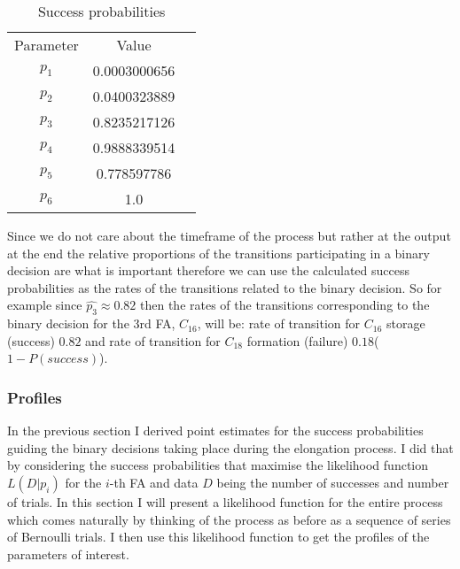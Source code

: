 \begin{table}
\centering
    \begin{tabular}{ccc}
    Parameter & Value \\
    $p_1$ &  0.0003000656 \\
    $p_2$ & 0.0400323889\\
    $p_3$ &  0.8235217126\\
    $p_4$ &  0.9888339514\\
    $p_5$ &  0.778597786 \\
    $p_6$ &  1.0
    \end{tabular}
\caption{Success probabilities}
\label{tab:param_estimates}
\end{table}
Since
we do not care about the timeframe of the process but rather at the
output at the end the relative proportions of the transitions
participating in a binary decision are what is important therefore we
can use the calculated success probabilities as the rates of the
transitions related to the binary decision. So for example since
$\hat{p_3}\approx0.82$ then the rates of the transitions corresponding to the
binary decision for the 3rd FA, $C_{16}$, will be: rate of transition
for $C_{16}$ storage (success) $0.82$ and rate of transition for
$C_{18}$ formation (failure) $0.18$($1-P(success)$).


\subsubsection{Profiles}
In the previous section I derived point estimates for the success
probabilities guiding the binary decisions taking place during the
elongation process. I did that by considering the success
probabilities that maximise the likelihood function $L(D|p_i)$ for
the $i$-th FA and data $D$ being the number of successes and number of
trials. In this section I will present a likelihood function for the
entire process which comes naturally by thinking of the process as
before as a sequence of series of Bernoulli trials. I then use this
likelihood function to get the profiles of the parameters of interest.


